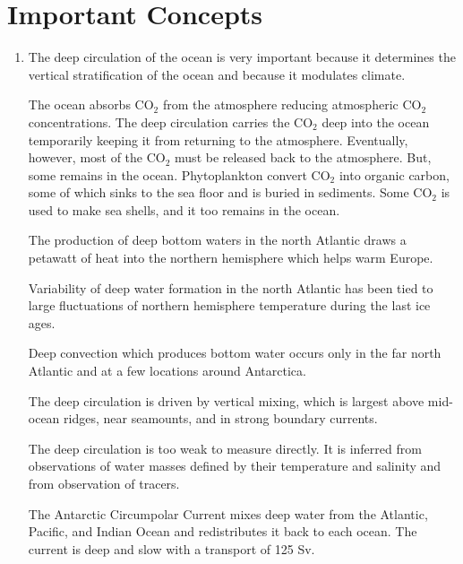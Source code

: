 \section{Important Concepts}
\begin{enumerate}
\item The deep circulation of the ocean is very important because it
determines the vertical stratification of the ocean and because it
modulates climate.

\vitem The ocean absorbs CO$_2$ from the atmosphere reducing
atmospheric CO$_2$ concentrations.  The deep circulation carries the
CO$_2$ deep into the ocean temporarily keeping it from returning to
the atmosphere. Eventually, however, most of the CO$_2$ must be
released back to the atmosphere. But, some remains in the
ocean. Phytoplankton convert CO$_2$ into organic carbon, some of which
sinks to the sea floor and is buried in sediments. Some CO$_2$ is used
to make sea shells, and it too remains in the ocean.

\vitem The production of deep bottom waters in the north
Atlantic draws
a petawatt of heat into the
northern hemisphere which helps warm Europe.

\vitem Variability of deep water formation in the north Atlantic has
been tied to large fluctuations of northern hemisphere temperature
during the last ice ages.

\vitem Deep convection which produces bottom water occurs only in the
far north Atlantic and at a few locations around Antarctica.

\vitem The deep circulation is driven by vertical
mixing, which is largest above mid-ocean
ridges, near seamounts, and in strong boundary currents.

\vitem The deep circulation is too weak to measure directly. It is
inferred from observations of water masses defined by their
temperature and salinity and from observation of tracers.

\vitem The Antarctic Circumpolar Current mixes deep water from the Atlantic, Pacific, and Indian
Ocean and redistributes it back to each ocean. The current is deep and
slow with a transport of 125 Sv.
\end{enumerate}


